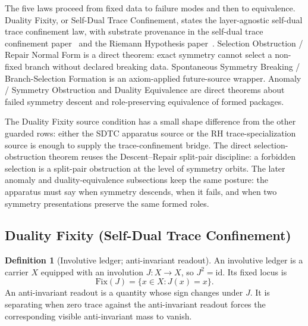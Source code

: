 \documentclass[11pt]{article}
\newcommand{\Jinv}{J}                  \newcommand{\Fixinv}{\mathrm{Fix}(\Jinv)}  \newcommand{\trAX}{\operatorname{tr}}
\newcommand{\PaperSDTC}{the self-dual trace confinement paper}
\newcommand{\PaperRH}{the Riemann Hypothesis paper}
\theoremstyle{definition}
\newtheorem{definition}[theorem]{Definition}
\begin{document}
The five laws proceed from fixed data to failure modes and then to
equivalence.  Duality Fixity, or Self-Dual Trace Confinement, states
the layer-agnostic self-dual trace confinement law, with substrate
provenance in \PaperSDTC\ \citep{Tsiokos2026SDTC} and
\PaperRH\ \citep{Tsiokos2026RH}.  Selection Obstruction / Repair
Normal Form is a direct theorem: exact symmetry cannot select a
non-fixed branch without declared breaking data.  Spontaneous
Symmetry Breaking / Branch-Selection Formation is an axiom-applied
future-source wrapper.  Anomaly / Symmetry Obstruction and Duality
Equivalence are direct theorems about failed symmetry descent and
role-preserving equivalence of formed packages.

The Duality Fixity source condition has a small shape difference from
the other guarded rows: either the SDTC apparatus source or the RH
trace-specialization source is enough to supply the trace-confinement
bridge.  The direct selection-obstruction theorem reuses the
Descent--Repair split-pair discipline: a forbidden selection is a
split-pair obstruction at the level of symmetry orbits.  The later
anomaly and duality-equivalence subsections keep the same posture:
the apparatus must say when symmetry descends, when it fails, and
when two symmetry presentations preserve the same formed roles.

\subsection{Duality Fixity (Self-Dual Trace Confinement)}\label{sec:symmetry:duality-fixity}

\begin{definition}[Involutive ledger; anti-invariant readout]\label{def:involutive-ledger}
An involutive ledger is a carrier \(X\) equipped with an involution
\(\Jinv:X\to X\), so \(\Jinv^2=\mathrm{id}\).  Its fixed locus is
\[
  \Fixinv=\{x\in X:\Jinv(x)=x\}.
\]
An anti-invariant readout is a quantity whose sign changes under
\(\Jinv\).  It is separating when zero trace against the
anti-invariant readout forces the corresponding visible
anti-invariant mass to vanish.
\end{definition}
\end{document}
